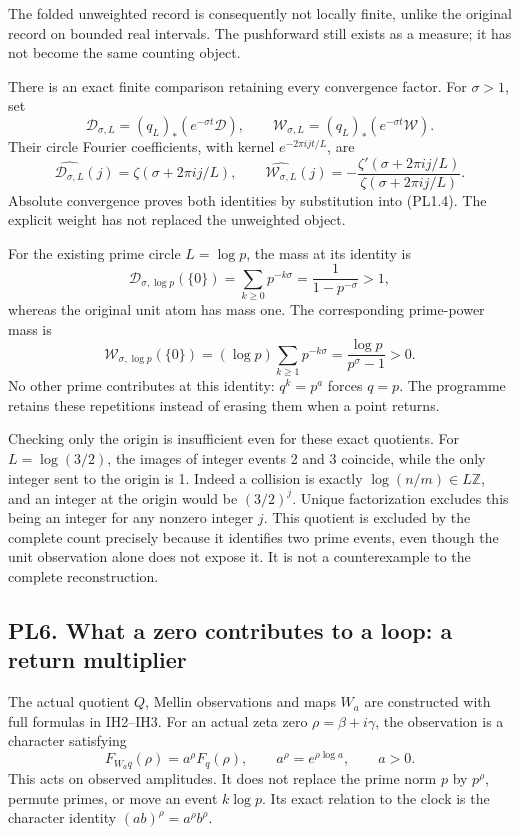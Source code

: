 The folded unweighted record is consequently not locally finite, unlike
the original record on bounded real intervals. The pushforward still
exists as a measure; it has not become the same counting object.

There is an exact finite comparison retaining every convergence factor.
For \(\sigma>1\), set \[
\mathcal D_{\sigma,L}=(q_L)_*(e^{-\sigma t}\mathcal D),\qquad
\mathcal W_{\sigma,L}=(q_L)_*(e^{-\sigma t}\mathcal W).
\] Their circle Fourier coefficients, with kernel \(e^{-2\pi i jt/L}\),
are \[
\widehat{\mathcal D_{\sigma,L}}(j)
=\zeta(\sigma+2\pi i j/L),\qquad
\widehat{\mathcal W_{\sigma,L}}(j)
=-\frac{\zeta'(\sigma+2\pi i j/L)}{\zeta(\sigma+2\pi i j/L)}.
\tag{PL5.2}
\] Absolute convergence proves both identities by substitution into
(PL1.4). The explicit weight has not replaced the unweighted object.

For the existing prime circle \(L=\log p\), the mass at its identity is
\[
\mathcal D_{\sigma,\log p}(\{0\})
=\sum_{k\ge0}p^{-k\sigma}=\frac1{1-p^{-\sigma}}>1,
\tag{PL5.3}
\] whereas the original unit atom has mass one. The corresponding
prime-power mass is \[
\mathcal W_{\sigma,\log p}(\{0\})
=(\log p)\sum_{k\ge1}p^{-k\sigma}
=\frac{\log p}{p^\sigma-1}>0.
\tag{PL5.4}
\] No other prime contributes at this identity: \(q^k=p^a\) forces
\(q=p\). The programme retains these repetitions instead of erasing them
when a point returns.

Checking only the origin is insufficient even for these exact quotients.
For \(L=\log(3/2)\), the images of integer events 2 and 3 coincide,
while the only integer sent to the origin is 1. Indeed a collision is
exactly \(\log(n/m)\in L\mathbb Z\), and an integer at the origin would
be \((3/2)^j\). Unique factorization excludes this being an integer for
any nonzero integer \(j\). This quotient is excluded by the complete
count precisely because it identifies two prime events, even though the
unit observation alone does not expose it. It is not a counterexample to
the complete reconstruction.

\subsection{PL6. What a zero contributes to a loop: a return
multiplier}\label{pl6.-what-a-zero-contributes-to-a-loop-a-return-multiplier}

The actual quotient \(Q\), Mellin observations and maps \(W_a\) are
constructed with full formulas in IH2--IH3. For an actual zeta zero
\(\rho=\beta+i\gamma\), the observation is a character satisfying \[
F_{W_aq}(\rho)=a^\rho F_q(\rho),\qquad
a^\rho=e^{\rho\log a},\qquad a>0.
\tag{PL6.1}
\] This acts on observed amplitudes. It does not replace the prime norm
\(p\) by \(p^\rho\), permute primes, or move an event \(k\log p\). Its
exact relation to the clock is the character identity
\((ab)^\rho=a^\rho b^\rho\).

